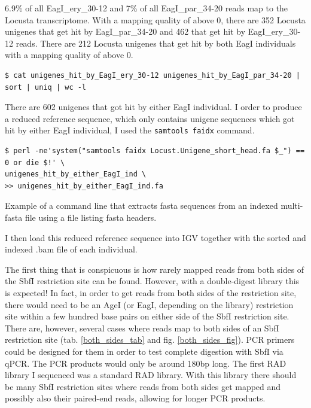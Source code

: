 \documentclass{article}\usepackage[]{graphicx}\usepackage[]{color}
\begin{document}
6.9\% of all EagI\_ery\_30-12 and 7\% of all EagI\_par\_34-20 reads map to the Locusta transcriptome. With a mapping quality of above 0, there are 352 Locusta unigenes that get hit by EagI\_par\_34-20  and 462 that get hit by EagI\_ery\_30-12 reads. There are 212 Locusta unigenes that get hit by both EagI individuals with a mapping quality of above 0.

\begin{Verbatim}
$ cat unigenes_hit_by_EagI_ery_30-12 unigenes_hit_by_EagI_par_34-20 | sort | uniq | wc -l
\end{Verbatim}
There are 602 unigenes that got hit by either EagI individual. I order to produce a reduced reference sequence, which only contains unigene sequences which got hit by either EagI individual, I used the \texttt{samtools faidx} command.

\begin{command}
\captionsetup{type=command}
\begin{Verbatim}
$ perl -ne'system("samtools faidx Locust.Unigene_short_head.fa $_") == 0 or die $!' \
unigenes_hit_by_either_EagI_ind \
>> unigenes_hit_by_either_EagI_ind.fa
\end{Verbatim}
\caption{\small Example of a command line that extracts fasta sequences from an indexed multi-fasta file using a file listing fasta headers.}
\label{reduced_reference}
\end{command}

I then load this reduced reference sequence into IGV together with the sorted and indexed .bam file of each individual.

The first thing that is conspicuous is how rarely mapped reads from both sides of the SbfI restriction site can be found. However, with a double-digest library this is expected! In fact, in order to get reads from both sides of the restriction site, there would need to be an AgeI (or EagI, depending on the library) restriction site within a few hundred base pairs on either side of the SbfI restriction site. There are, however, several cases where reads map to both sides of an SbfI restriction site (tab. \ref{both_sides_tab} and fig. \ref{both_sides_fig}). PCR primers could be designed for them in order to test complete digestion with SbfI via qPCR. The PCR products would only be around 180bp long. The first RAD library I sequenced was a standard RAD library. With this library there should be many SbfI restriction sites where reads from both sides get mapped and possibly also their paired-end reads, allowing for longer PCR products. 
\end{document}
